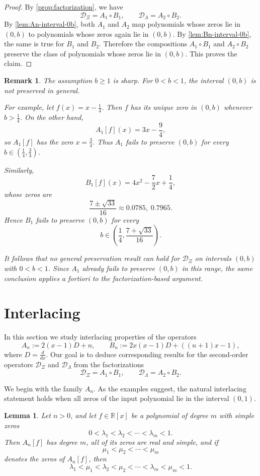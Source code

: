 \documentclass[11pt,twoside]{article}
\newtheorem{lemma}[theorem]{Lemma}
\newtheorem{remark}[theorem]{Remark}
\numberwithin{equation}{section}
\begin{document}
\begin{proof}
By \cref{prop:factorization}, we have
\[
\mathcal D_{\Xi}=A_1\circ B_1,
\qquad
\mathcal D_{\Lambda}=A_2\circ B_2.
\]
By \cref{lem:An-interval-0b}, both \(A_1\) and \(A_2\) map polynomials whose zeros lie in \((0,b)\) to polynomials whose zeros again lie in \((0,b)\). By \cref{lem:Bn-interval-0b}, the same is true for \(B_1\) and \(B_2\). Therefore the compositions \(A_1\circ B_1\) and \(A_2\circ B_2\) preserve the class of polynomials whose zeros lie in \((0,b)\). This proves the claim.
\end{proof}

\begin{remark}
The assumption \(b\ge 1\) is sharp. For \(0<b<1\), the interval \((0,b)\) is not preserved in general.

For example, let \(f(x)=x-\frac14\). Then \(f\) has its unique zero in \((0,b)\) whenever \(b>\frac14\). On the other hand,
\[
A_1[f](x)=3x-\frac94,
\]
so \(A_1[f]\) has the zero \(x=\frac34\). Thus \(A_1\) fails to preserve \((0,b)\) for every \(b\in(\frac14,\frac34)\).

Similarly,
\[
B_1[f](x)=4x^2-\frac72x+\frac14,
\]
whose zeros are
\[
\frac{7\pm\sqrt{33}}{16}\approx 0.0785,\;0.7965.
\]
Hence \(B_1\) fails to preserve \((0,b)\) for every
\[
b\in\left(\frac14,\frac{7+\sqrt{33}}{16}\right).
\]

It follows that no general preservation result can hold for \(\mathcal D_{\Xi}\) on intervals \((0,b)\) with \(0<b<1\). Since \(A_1\) already fails to preserve \((0,b)\) in this range, the same conclusion applies a fortiori to the factorization-based argument.
\end{remark}

\section{Interlacing}
In this section we study interlacing properties of the operators
\[
A_n:=2(x-1)D+n,
\qquad
B_n:=2x(x-1)D+((n+1)x-1),
\]
where \(D=\frac{d}{dx}\). Our goal is to deduce corresponding results for the second-order operators \(\mathcal D_{\Xi}\) and \(\mathcal D_{\Lambda}\) from the factorizations
\[
\mathcal D_{\Xi}=A_1\circ B_1,
\qquad
\mathcal D_{\Lambda}=A_2\circ B_2.
\]

We begin with the family \(A_n\). As the examples suggest, the natural interlacing statement holds when all zeros of the input polynomial lie in the interval \((0,1)\).

\begin{lemma}\label{lem:An-interlacing}
Let \(n>0\), and let \(f\in\mathbb R[x]\) be a polynomial of degree \(m\) with simple zeros
\[
0<\lambda_1<\lambda_2<\cdots<\lambda_m<1.
\]
Then \(A_n[f]\) has degree \(m\), all of its zeros are real and simple, and if
\[
\mu_1<\mu_2<\cdots<\mu_m
\]
denotes the zeros of \(A_n[f]\), then
\[
\lambda_1<\mu_1<\lambda_2<\mu_2<\cdots<\lambda_m<\mu_m<1.
\]
\end{lemma}
\end{document}
